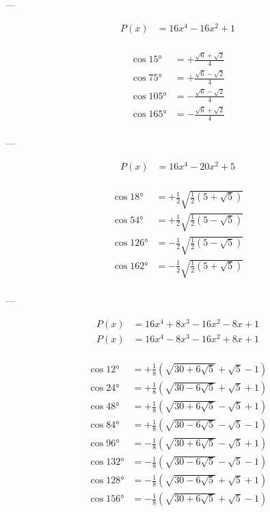---

$$
\begin{aligned}
    P(x) &= 16 x^4-16 x^2+1\\
\end{aligned}
$$

$$
\begin{aligned}
    \cos 15°  &= +\frac{\sqrt{6}+\sqrt{2}}{4}\\
    \cos 75°  &= +\frac{\sqrt{6}-\sqrt{2}}{4}\\
    \cos 105° &= -\frac{\sqrt{6}-\sqrt{2}}{4}\\
    \cos 165° &= -\frac{\sqrt{6}+\sqrt{2}}{4}\\
\end{aligned}
$$

---

$$
\begin{aligned}
    P(x) &= 16 x^4-20 x^2+5\\
\end{aligned}
$$

$$
\begin{aligned}
    \cos 18°  &= +\frac{1}{2} \sqrt{\frac{1}{2} \left(5+\sqrt{5}\right)}\\
    \cos 54°  &= +\frac{1}{2} \sqrt{\frac{1}{2} \left(5-\sqrt{5}\right)}\\
    \cos 126° &= -\frac{1}{2} \sqrt{\frac{1}{2} \left(5-\sqrt{5}\right)}\\
    \cos 162° &= -\frac{1}{2} \sqrt{\frac{1}{2} \left(5+\sqrt{5}\right)}\\
\end{aligned}
$$

---

$$
\begin{aligned}
    P(x) &= 16 x^4+8 x^3-16 x^2-8 x+1\\
    P(x) &= 16 x^4-8 x^3-16 x^2+8 x+1\\
\end{aligned}
$$

$$
\begin{aligned}
    \cos 12°  &= +\frac{1}{8} \left(\sqrt{30+6\sqrt{5}}+\sqrt{5}-1\right)\\
    \cos 24°  &= +\frac{1}{8} \left(\sqrt{30-6\sqrt{5}}+\sqrt{5}+1\right)\\
    \cos 48°  &= +\frac{1}{8} \left(\sqrt{30+6\sqrt{5}}-\sqrt{5}+1\right)\\
    \cos 84°  &= +\frac{1}{8} \left(\sqrt{30-6\sqrt{5}}-\sqrt{5}-1\right)\\
    \cos 96°  &= -\frac{1}{8} \left(\sqrt{30+6\sqrt{5}}-\sqrt{5}+1\right)\\
    \cos 132° &= -\frac{1}{8} \left(\sqrt{30-6\sqrt{5}}-\sqrt{5}-1\right)\\
    \cos 128° &= -\frac{1}{8} \left(\sqrt{30-6\sqrt{5}}+\sqrt{5}+1\right)\\
    \cos 156° &= -\frac{1}{8} \left(\sqrt{30+6\sqrt{5}}+\sqrt{5}-1\right)\\
\end{aligned}
$$

